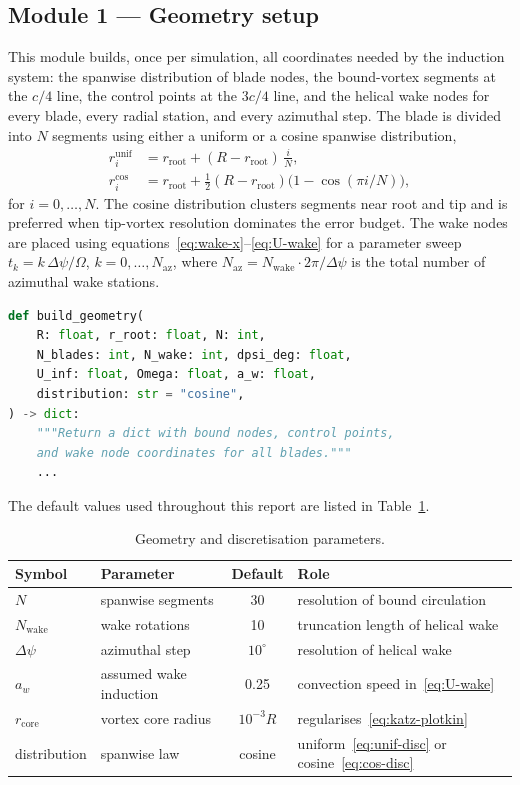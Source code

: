 \subsection{Module 1 --- Geometry setup}
\label{sec:code-geometry}

This module builds, once per simulation, all coordinates needed by the induction system: the spanwise distribution of blade nodes, the bound-vortex segments at the $c/4$ line, the control points at the $3c/4$ line, and the helical wake nodes for every blade, every radial station, and every azimuthal step. The blade is divided into $N$ segments using either a uniform or a cosine spanwise distribution,
\begin{align}
r_i^{\text{unif}}   &= r_{\text{root}} + (R-r_{\text{root}})\,\frac{i}{N}, \label{eq:unif-disc}\\
r_i^{\text{cos}}    &= r_{\text{root}} + \tfrac{1}{2}(R-r_{\text{root}})\bigl(1-\cos(\pi i/N)\bigr), \label{eq:cos-disc}
\end{align}
for $i=0,\dots,N$. The cosine distribution clusters segments near root and tip and is preferred when tip-vortex resolution dominates the error budget. The wake nodes are placed using equations~\eqref{eq:wake-x}--\eqref{eq:U-wake} for a parameter sweep $t_k = k\,\Delta\psi/\Omega$, $k=0,\dots,N_{\text{az}}$, where $N_{\text{az}}=N_{\text{wake}}\cdot 2\pi/\Delta\psi$ is the total number of azimuthal wake stations.

\begin{lstlisting}[language=Python]
def build_geometry(
    R: float, r_root: float, N: int,
    N_blades: int, N_wake: int, dpsi_deg: float,
    U_inf: float, Omega: float, a_w: float,
    distribution: str = "cosine",
) -> dict:
    """Return a dict with bound nodes, control points,
    and wake node coordinates for all blades."""
    ...
\end{lstlisting}

The default values used throughout this report are listed in Table~\ref{tab:geom-params}.

\begin{table}[H]
\centering
\caption{Geometry and discretisation parameters.}
\label{tab:geom-params}
\begin{tabular}{@{}llcl@{}}
\toprule
Symbol & Parameter & Default & Role \\ \midrule
$N$            & spanwise segments       & 30          & resolution of bound circulation \\
$N_{\text{wake}}$ & wake rotations       & 10          & truncation length of helical wake \\
$\Delta\psi$   & azimuthal step          & $10^\circ$  & resolution of helical wake \\
$a_w$          & assumed wake induction  & 0.25        & convection speed in~\eqref{eq:U-wake} \\
$r_{\text{core}}$ & vortex core radius   & $10^{-3}R$  & regularises~\eqref{eq:katz-plotkin} \\
distribution   & spanwise law            & cosine      & uniform~\eqref{eq:unif-disc} or cosine~\eqref{eq:cos-disc} \\
\bottomrule
\end{tabular}
\end{table}

